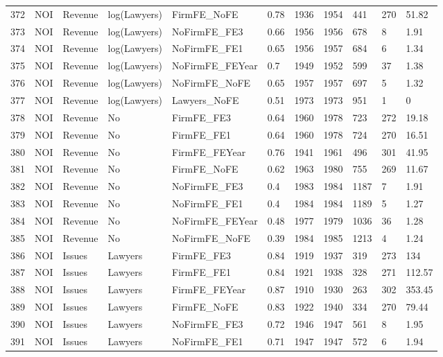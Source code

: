 \documentclass{article}
\begin{document}
\begin{table}[H]
\begin{tabular}{rllllllllll}
  372 & NOI & Revenue & log(Lawyers) & FirmFE\_NoFE & 0.78 & 1936 & 1954 & 441 & 270 & 51.82 \\ 
  373 & NOI & Revenue & log(Lawyers) & NoFirmFE\_FE3 & 0.66 & 1956 & 1956 & 678 & 8 & 1.91 \\ 
  374 & NOI & Revenue & log(Lawyers) & NoFirmFE\_FE1 & 0.65 & 1956 & 1957 & 684 & 6 & 1.34 \\ 
  375 & NOI & Revenue & log(Lawyers) & NoFirmFE\_FEYear & 0.7 & 1949 & 1952 & 599 & 37 & 1.38 \\ 
  376 & NOI & Revenue & log(Lawyers) & NoFirmFE\_NoFE & 0.65 & 1957 & 1957 & 697 & 5 & 1.32 \\ 
  377 & NOI & Revenue & log(Lawyers) & Lawyers\_NoFE & 0.51 & 1973 & 1973 & 951 & 1 & 0 \\ 
  378 & NOI & Revenue & No & FirmFE\_FE3 & 0.64 & 1960 & 1978 & 723 & 272 & 19.18 \\ 
  379 & NOI & Revenue & No & FirmFE\_FE1 & 0.64 & 1960 & 1978 & 724 & 270 & 16.51 \\ 
  380 & NOI & Revenue & No & FirmFE\_FEYear & 0.76 & 1941 & 1961 & 496 & 301 & 41.95 \\ 
  381 & NOI & Revenue & No & FirmFE\_NoFE & 0.62 & 1963 & 1980 & 755 & 269 & 11.67 \\ 
  382 & NOI & Revenue & No & NoFirmFE\_FE3 & 0.4 & 1983 & 1984 & 1187 & 7 & 1.91 \\ 
  383 & NOI & Revenue & No & NoFirmFE\_FE1 & 0.4 & 1984 & 1984 & 1189 & 5 & 1.27 \\ 
  384 & NOI & Revenue & No & NoFirmFE\_FEYear & 0.48 & 1977 & 1979 & 1036 & 36 & 1.28 \\ 
  385 & NOI & Revenue & No & NoFirmFE\_NoFE & 0.39 & 1984 & 1985 & 1213 & 4 & 1.24 \\ 
  386 & NOI & Issues & Lawyers & FirmFE\_FE3 & 0.84 & 1919 & 1937 & 319 & 273 & 134 \\ 
  387 & NOI & Issues & Lawyers & FirmFE\_FE1 & 0.84 & 1921 & 1938 & 328 & 271 & 112.57 \\ 
  388 & NOI & Issues & Lawyers & FirmFE\_FEYear & 0.87 & 1910 & 1930 & 263 & 302 & 353.45 \\ 
  389 & NOI & Issues & Lawyers & FirmFE\_NoFE & 0.83 & 1922 & 1940 & 334 & 270 & 79.44 \\ 
  390 & NOI & Issues & Lawyers & NoFirmFE\_FE3 & 0.72 & 1946 & 1947 & 561 & 8 & 1.95 \\ 
  391 & NOI & Issues & Lawyers & NoFirmFE\_FE1 & 0.71 & 1947 & 1947 & 572 & 6 & 1.94 \\ 

\end{tabular}
\end{table}
\end{document}
